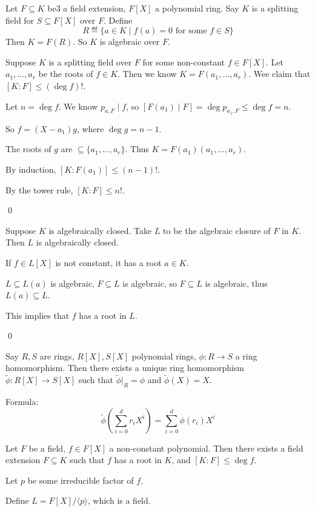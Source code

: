 \documentclass[x11names,reqno,14pt]{extarticle}
\begin{document}
Let $F \subseteq K$ be3 a field extension, $F[X]$ a polynomial ring. Say $K$ is a splitting field for $S\subseteq F[X]$ over $F$. Define
\[
R \eqdef \{a\in K \mid f(a) = 0\text{ for some }f\in S\}
\]
Then $K = F(R)$. So $K$ is algebraic over $F$. 

\claim Suppose $K$ is a splitting field over $F$ for some non-constant $f \in F[X]$. Let $a_1, \dots, a_r$ be the roots of $f \in K$. Then we know $K = F(a_1,\dots, a_r)$. Wee claim that $[K:F] \leq (\deg f)!$. 

\proof 

Let $n = \deg f$. We know $p_{a, F}\mid f$, so $[F(a_1) \mid F] = \deg p_{a_1, F} \leq \deg f = n$. 

So $f = (X - a_1)g$, where $\deg g = n - 1$. 

The roots of $g$ are $\subseteq\{a_1,\dots, a_r\}$. Thus $K = F(a_1)(a_1,\dots,a_r)$. 

By induction, $[K:F(a_1)]\leq (n - 1)!$. 

By the tower rule, $[K:F]\leq n!$. 

\qed

\claim Suppose $K$ is algebraically closed. Take $L$ to be the algebraic closure of $F$ in $K$. Then $L$ is algebraically closed. 

\proof

If $f \in L[X]$ is not constant, it has a root $a \in K$. 

$L \subseteq L(a)$ is algebraic, $F \subseteq L$ is algebraic, so $F \subseteq L$ is algebraic, thus $L(a) \subseteq L$. 

This implies that $f$ has a root in $L$. 

\qed

Say $R,S$ are rings, $R[X],S[X]$ polynomial rings, $\phi:R\to S$ a ring homomorphism. Then there exists a unique ring homomorphism $\tilde{\phi}:R[X]\to S[X]$ such that $\tilde{\phi}|_R = \phi$ and $\tilde{\phi}(X) = X$. 

Formula:
\[
\tilde{\phi}\left(\sum_{i=0}^d r_i X^i\right) = \sum_{i=0}^d\phi(r_i) X^i
\]


Let $F$ be a field, $f \in F[X]$ a non-constant polynomial. Then there exists a field extension $F \subseteq K$ such that $f$ has a root in $K$, and $[K:F] \leq \deg f$. 

\proof

Let $p$ be some irreducible factor of $f$. 

Define $L = F[X]/\langle p \rangle$, which is a field. 
\end{document}
